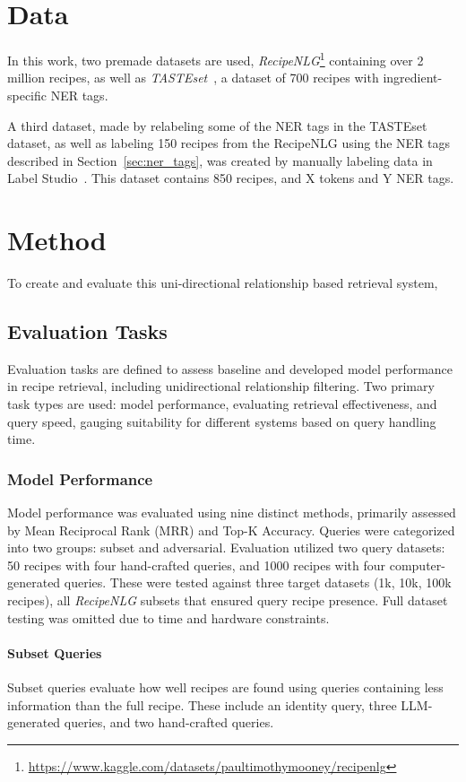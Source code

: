 \documentclass[11pt]{article}
\begin{document}
\section{Data}
In this work, two premade datasets are used,
\emph{RecipeNLG}\footnote{\url{https://www.kaggle.com/datasets/paultimothymooney/recipenlg}}
containing over 2 million recipes, as well as
\emph{TASTEset}~\cite{TASTEset}, a dataset of
700 recipes with ingredient-specific NER tags.

A third dataset, made by relabeling some of the NER tags in the TASTEset dataset,
as well as labeling 150 recipes from the RecipeNLG using the NER tags
described in Section~\ref{sec:ner_tags}, was created by manually labeling
data in Label Studio~\cite{LabelStudio}.
This dataset contains 850 recipes, and X tokens and Y NER tags.

\section{Method}
To create and evaluate this uni-directional relationship based retrieval system, 

\subsection{Evaluation Tasks}
Evaluation tasks are defined to assess baseline and developed model performance
in recipe retrieval, including unidirectional relationship filtering.
Two primary task types are used: model performance, evaluating retrieval
effectiveness, and query speed, gauging suitability for different systems based
on query handling time.

\subsubsection{Model Performance}\label{sec:modelperfomance}
Model performance was evaluated using nine distinct methods, primarily assessed
by Mean Reciprocal Rank (MRR) and Top-K Accuracy.
Queries were categorized into two groups: subset and adversarial.
Evaluation utilized two query datasets: 50 recipes with four hand-crafted
queries, and 1000 recipes with four computer-generated queries.
These were tested against three target datasets (1k, 10k, 100k recipes), all
\emph{RecipeNLG} subsets that ensured query recipe presence.
Full dataset testing was omitted due to time and hardware constraints.
\paragraph{Subset Queries}
Subset queries evaluate how well recipes are found using queries containing less information than the full recipe.
These include an identity query, three LLM-generated queries, and two hand-crafted queries.
\end{document}
